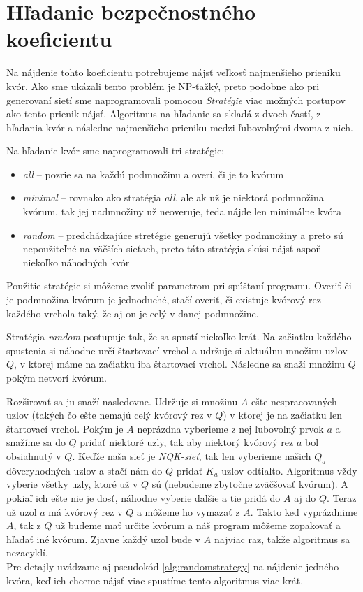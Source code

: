 \section {Hľadanie bezpečnostného koeficientu}

Na nájdenie tohto koeficientu potrebujeme nájsť veľkosť najmenšieho prieniku kvór.
Ako sme ukázali tento problém je NP-ťažký, preto podobne ako pri generovaní sietí
sme naprogramovali pomocou \textit{Stratégie} viac možných postupov ako tento
prienik nájsť.
Algoritmus na hľadanie sa skladá z dvoch častí, z hľadania kvór a následne
najmenšieho prieniku medzi ľubovoľnými dvoma z nich.

Na hľadanie kvór sme naprogramovali tri stratégie:

\begin{itemize}
  \item \textit{all} -- pozrie sa na každú podmnožinu a overí, či je to kvórum
  \item \textit{minimal} -- rovnako ako stratégia \textit{all}, ale ak už je niektorá
                            podmnožina kvórum, tak jej nadmnožiny už neoveruje,
                            teda nájde len minimálne kvóra
  \item \textit{random} -- predchádzajúce stretégie generujú všetky podmnožiny a preto
                           sú nepoužiteľné na väčších sieťach, preto táto stratégia
                           skúsi nájsť aspoň niekoľko náhodných kvór
\end{itemize}

Použitie stratégie si môžeme zvoliť parametrom pri spúštaní programu.
Overiť či je podmnožina kvórum je jednoduché, stačí overiť, či existuje kvórový rez
každého vrchola taký, že aj on je celý v danej podmnožine.

Stratégia \textit{random} postupuje tak, že sa spustí niekoľko krát.
Na začiatku každého spustenia si náhodne určí štartovací vrchol a udržuje si aktuálnu
množinu uzlov $Q$, v ktorej máme na začiatku iba štartovací vrchol.
Následne sa snaží množinu $Q$  pokým netvorí kvórum.

Rozširovať sa ju snaží nasledovne. Udržuje si množinu $A$ ešte nespracovaných uzlov
(takých čo ešte nemajú celý kvórový rez v $Q$) v ktorej je na začiatku len štartovací
vrchol.
Pokým je $A$ neprázdna vyberieme z nej ľubovoľný prvok $a$ a snažíme sa do $Q$ pridať
niektoré uzly, tak aby niektorý kvórový rez $a$ bol obsiahnutý v $Q$. Keďže naša sieť
je \textit{NQK-sieť}, tak len vyberieme našich $Q_a$ dôveryhodných uzlov a stačí nám
do $Q$ pridať $K_a$ uzlov odtiaľto. Algoritmus vždy vyberie všetky uzly, ktoré už
v $Q$ sú (nebudeme zbytočne zväčšovať kvórum). A pokiaľ ich ešte nie je dosť, náhodne
vyberie ďalšie a tie pridá do $A$ aj do $Q$. Teraz už uzol $a$ má kvórový rez v $Q$
a môžeme ho vymazať z $A$. Takto keď vyprázdnime $A$, tak z $Q$ už budeme mať určite
kvórum a náš program môžeme zopakovať a hľadať iné kvórum. Zjavne každý uzol bude v $A$
najviac raz, takže algoritmus sa nezacyklí.\\
Pre detajly uvádzame aj pseudokód \ref{alg:randomstrategy} na nájdenie jedného kvóra,
keď ich chceme nájsť viac spustíme tento algoritmus viac krát.

